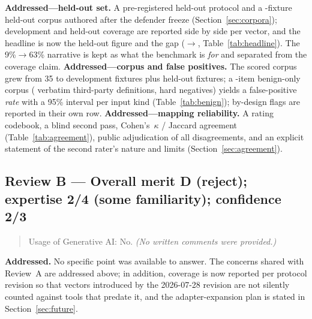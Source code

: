 \documentclass[conference]{IEEEtran}
\newcommand{\rev}{2026-07-28}
\begin{document}
\textbf{Addressed---held-out set.} A pre-registered held-out protocol and a \nHeldout-fixture held-out corpus authored after the defender freeze (Section~\ref{sec:corpora}); development and held-out coverage are reported side by side per vector, and the headline is now the held-out figure and the gap (\bastDevOrig{}$\rightarrow$\bastHeldout{}, Table~\ref{tab:headline}). The 9\%$\rightarrow$63\% narrative is kept as what the benchmark is \emph{for} and separated from the coverage claim.
\textbf{Addressed---corpus and false positives.} The scored corpus grew from 35 to \nDev{} development fixtures plus \nHeldout{} held-out fixtures; a \nBenign-item benign-only corpus (\nHarvested{} verbatim third-party definitions, \nHardNeg{} hard negatives) yields a false-positive \emph{rate} with a 95\% interval per input kind (Table~\ref{tab:benign}); by-design flags are reported in their own row.
\textbf{Addressed---mapping reliability.} A rating codebook, a blind second pass, Cohen's~$\kappa$ / Jaccard agreement (Table~\ref{tab:agreement}), public adjudication of all \nDisagree{} disagreements, and an explicit statement of the second rater's nature and limits (Section~\ref{sec:agreement}).

\subsection*{Review B --- Overall merit D (reject); expertise 2/4 (some familiarity); confidence 2/3}
\begin{quote}\small
Usage of Generative AI: No. \emph{(No written comments were provided.)}
\end{quote}
\textbf{Addressed.} No specific point was available to answer. The concerns shared with Review~A are addressed above; in addition, coverage is now reported per protocol revision so that vectors introduced by the \rev{} revision are not silently counted against tools that predate it, and the adapter-expansion plan is stated in Section~\ref{sec:future}.
\end{document}
